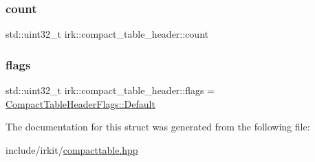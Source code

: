 \subsubsection{\texorpdfstring{count}{count}}
{\footnotesize\ttfamily std\+::uint32\+\_\+t irk\+::compact\+\_\+table\+\_\+header\+::count}

\mbox{\label{structirk_1_1compact__table__header_ae76b0ba32ba8873575f480e3148f1738}} 
\subsubsection{\texorpdfstring{flags}{flags}}
{\footnotesize\ttfamily std\+::uint32\+\_\+t irk\+::compact\+\_\+table\+\_\+header\+::flags = \mbox{\hyperlink{structirk_1_1CompactTableHeaderFlags_a18debbc227dbcb7726817a08b541e5e0}{Compact\+Table\+Header\+Flags\+::\+Default}}}



The documentation for this struct was generated from the following file\+:\begin{DoxyCompactItemize}
\item 
include/irkit/\mbox{\hyperlink{compacttable_8hpp}{compacttable.\+hpp}}\end{DoxyCompactItemize}

